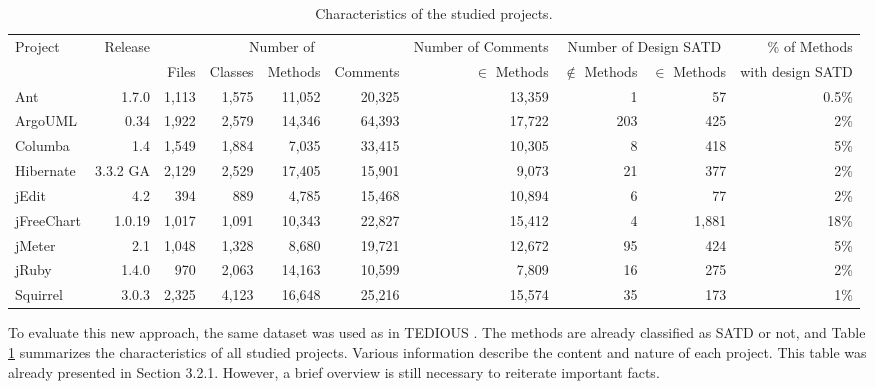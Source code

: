 \begin{landscape}
	\begin{table}[t]
		\caption{Characteristics of the studied projects.}
		\label{tab:projects}
		\centering
		\begin{adjustbox}{center}
			\begin{tabular}{l r | r r r r | r | r r | r}
				\hline
				\multirow{2}{*}{Project} & \multirow{2}{*}{Release} &\multicolumn{4}{c|}{Number of} &\multicolumn{1}{c|}{Number of Comments}
				&\multicolumn{2}{c|}{Number of Design SATD} & \% of Methods\\
				&& Files& Classes& Methods& Comments                      & $\in$ Methods& $\notin$ Methods & $\in$ Methods & with design SATD\\
				\hline
				Ant&1.7.0 & 1,113 & 1,575 & 11,052 & 20,325               & 13,359        &  1 & 57 & 0.5\% \\
				ArgoUML&0.34& 1,922 & 2,579 & 14,346 & 64,393       &  17,722       & 203 & 425  & 2\%\\
				Columba&1.4& 1,549 & 1,884 & 7,035 & 33,415           & 10,305        & 8 & 418 & 5\%  \\
				Hibernate&3.3.2 GA & 2,129 & 2,529 & 17,405 & 15,901 & 9,073        & 21  &  377  &  2\%\\
				jEdit & 4.2 & 394 & 889 & 4,785 & 15,468                     &10,894         & 6  & 77  & 2\% \\
				jFreeChart&1.0.19 & 1,017 & 1,091 & 10,343 & 22,827  & 15,412       &  4  & 1,881  & 18\%\\
				jMeter&2.1& 1,048 & 1,328 & 8,680 & 19,721                &  12,672      & 95 &  424 & 5\%  \\
				jRuby&1.4.0 & 970 & 2,063 & 14,163 & 10,599               & 7,809        & 16   & 275  &  2\%\\
				Squirrel&3.0.3 & 2,325 & 4,123 & 16,648 & 25,216         & 15,574      &35  & 173  & 1\%\\
				\hline
			\end{tabular}
		\end{adjustbox}
		\vspace{-4mm}
	\end{table}
\end{landscape}

To evaluate this new approach, the same dataset was used as in TEDIOUS \citep{maldonado17}. The methods are already classified as SATD or not, and Table \ref{tab:projects} summarizes the characteristics of all studied projects. Various information describe the content and nature of each project. This table was already presented in Section 3.2.1. However, a brief overview is still necessary to reiterate important facts. 

